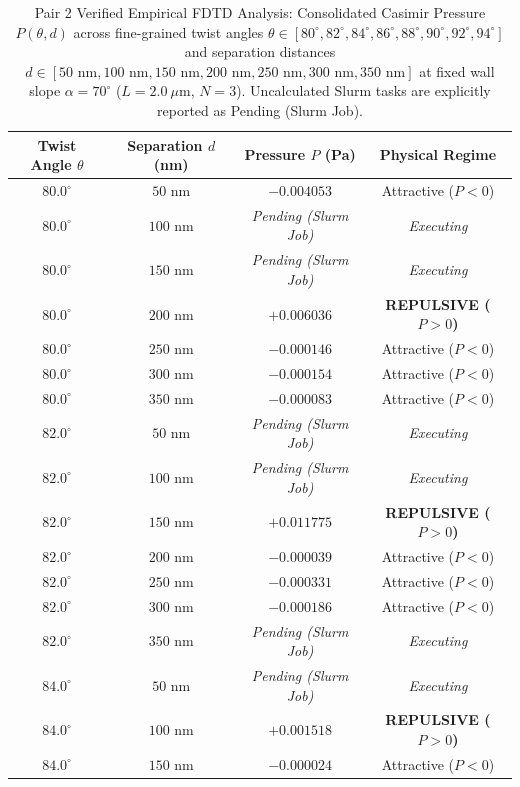 \documentclass[12pt,letterpaper]{article}
\begin{document}
\begin{table}[h!]
\centering
\caption{Pair 2 Verified Empirical FDTD Analysis: Consolidated Casimir Pressure $P(\theta, d)$ across fine-grained twist angles $\theta \in [80^\circ, 82^\circ, 84^\circ, 86^\circ, 88^\circ, 90^\circ, 92^\circ, 94^\circ]$ and separation distances $d \in [50\text{ nm}, 100\text{ nm}, 150\text{ nm}, 200\text{ nm}, 250\text{ nm}, 300\text{ nm}, 350\text{ nm}]$ at fixed wall slope $\alpha = 70^\circ$ ($L=2.0\ \mu\text{m}$, $N=3$). Uncalculated Slurm tasks are explicitly reported as Pending (Slurm Job).}
\begin{tabular}{cccc}
\hline
\textbf{Twist Angle $\theta$} & \textbf{Separation $d$ (nm)} & \textbf{Pressure $P$ (Pa)} & \textbf{Physical Regime} \\
\hline
$80.0^\circ$ & $50$ nm & $-0.004053$ & Attractive ($P<0$) \\
$80.0^\circ$ & $100$ nm & \textit{Pending (Slurm Job)} & \textit{Executing} \\
$80.0^\circ$ & $150$ nm & \textit{Pending (Slurm Job)} & \textit{Executing} \\
$80.0^\circ$ & $200$ nm & $+0.006036$ & \textbf{REPULSIVE ($P>0$)} \\
$80.0^\circ$ & $250$ nm & $-0.000146$ & Attractive ($P<0$) \\
$80.0^\circ$ & $300$ nm & $-0.000154$ & Attractive ($P<0$) \\
$80.0^\circ$ & $350$ nm & $-0.000083$ & Attractive ($P<0$) \\
$82.0^\circ$ & $50$ nm & \textit{Pending (Slurm Job)} & \textit{Executing} \\
$82.0^\circ$ & $100$ nm & \textit{Pending (Slurm Job)} & \textit{Executing} \\
$82.0^\circ$ & $150$ nm & $+0.011775$ & \textbf{REPULSIVE ($P>0$)} \\
$82.0^\circ$ & $200$ nm & $-0.000039$ & Attractive ($P<0$) \\
$82.0^\circ$ & $250$ nm & $-0.000331$ & Attractive ($P<0$) \\
$82.0^\circ$ & $300$ nm & $-0.000186$ & Attractive ($P<0$) \\
$82.0^\circ$ & $350$ nm & \textit{Pending (Slurm Job)} & \textit{Executing} \\
$84.0^\circ$ & $50$ nm & \textit{Pending (Slurm Job)} & \textit{Executing} \\
$84.0^\circ$ & $100$ nm & $+0.001518$ & \textbf{REPULSIVE ($P>0$)} \\
$84.0^\circ$ & $150$ nm & $-0.000024$ & Attractive ($P<0$) \\

\end{tabular}
\end{table}
\end{document}
